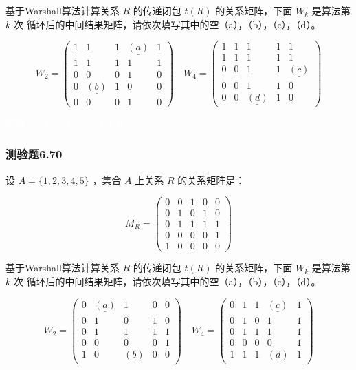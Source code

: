 \documentclass[UTF8, heading=true]{ctexart}
\begin{document}
基于Warshall算法计算关系 $R$ 的传递闭包 $t(R)$ 的关系矩阵，下面 $W_k$ 是算法第 $k$ 次
循环后的中间结果矩阵，请依次填写其中的空（a），（b），（c），（d）。

$$W_2=\left(\begin{array}{ccccc}1 & 1 & 1 & \underline{(a)} & 1 \\ 1 & 1 & 1 & 1 & 1 \\ 0 & 0 & 0 & 1 & 0 \\ 0 & \underline{(b)} & 1 & 0 & 0 \\ 0 & 0 & 0 & 1 & 0\end{array}\right) \quad W_4=\left(\begin{array}{ccccc}1 & 1 & 1 & 1 & 1 \\ 1 & 1 & 1 & 1 & 1 \\ 0 & 0 & 1 & 1 & \underline{(c)} \\ 0 & 0 & 1 & 1 & 0 \\ 0 & 0 & \underline{(d)} & 1 & 0\end{array}\right)$$

\textcolor{white}{答案：（a）1 （b）0 （c）0 （d） 1}




\subsubsection{测验题6.70}

设 $A=\{1,2,3,4,5\}$ ，集合 $A$ 上关系 $R$ 的关系矩阵是：

$$
M_R=\left(\begin{array}{lllll}
0 & 0 & 1 & 0 & 0 \\
0 & 1 & 0 & 1 & 0 \\
0 & 1 & 1 & 1 & 1 \\
0 & 0 & 0 & 0 & 1 \\
1 & 0 & 0 & 0 & 0
\end{array}\right)
$$

基于Warshall算法计算关系 $R$ 的传递闭包 $t(R)$ 的关系矩阵，下面 $W_k$ 是算法第 $k$ 次
循环后的中间结果矩阵，请依次填写其中的空（a），（b），（c），（d）。

$$
W_2=\left(\begin{array}{ccccc}
0 & \underline{(a)} & 1 & 0 & 0 \\
0 & 1 & 0 & 1 & 0 \\
0 & 1 & 1 & 1 & 1 \\
0 & 0 & 0 & 0 & 1 \\
1 & 0 & \underline{(b)} & 0 & 0
\end{array}\right) \quad W_4=\left(\begin{array}{ccccc}
0 & 1 & 1 & \underline{(c)} & 1 \\
0 & 1 & 0 & 1 & 1 \\
0 & 1 & 1 & 1 & 1 \\
0 & 0 & 0 & 0 & 1 \\
1 & 1 & 1 & \underline{(d)} & 1
\end{array}\right)
$$
\end{document}
